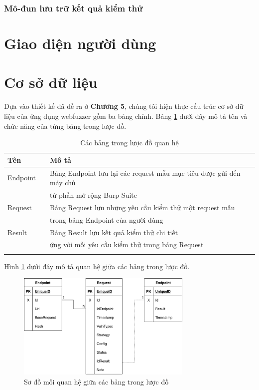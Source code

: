 \subsubsection{Mô-đun lưu trữ kết quả kiểm thử}
\section{Giao diện người dùng}
\section{Cơ sở dữ liệu}
Dựa vào thiết kế đã đề ra ở \textbf{Chương 5}, chúng tôi hiện thực cấu trúc cơ sở dữ liệu của ứng dụng webfuzzer gồm ba bảng chính. Bảng \ref{tab:db-tables} dưới đây mô tả tên và chức năng của từng bảng trong lược đồ.
\begin{table}[ht]
    \centering
    \caption{Các bảng trong lược đồ quan hệ}
    \label{tab:db-tables}
    \begin{tabular}[ht]{lll}
        \toprule[1pt]\midrule[0.3pt]
            \textbf{Tên}& &\textbf{Mô tả}\\ 
        \midrule
            Endpoint& &Bảng Endpoint lưu lại các request mẫu mục tiêu được gửi đến máy chủ \\
            {}& &từ phần mở rộng Burp Suite\\
            \addlinespace
            Request& &Bảng Request lưu những yêu cầu kiểm thử một request mẫu \\
            {}& &trong bảng Endpoint của người dùng\\
            \addlinespace
            Result& &Bảng Result lưu kết quả kiểm thử chi tiết \\
            {}& &ứng với mỗi yêu cầu kiểm thử trong bảng Request\\
            \addlinespace
        \midrule[0.3pt]\bottomrule[1pt]
    \end{tabular}
\end{table}
\FloatBarrier
Hình \ref{fig:db-schema} dưới đây mô tả quan hệ giữa các bảng trong lược đồ.
\begin{figure}[H]
  \centering
    \includegraphics[width=0.75\textwidth,keepaspectratio=true]{images/database-design.png}
  \caption{Sơ đồ mối quan hệ giữa các bảng trong lược đồ}
  \label{fig:db-schema}
\end{figure}
